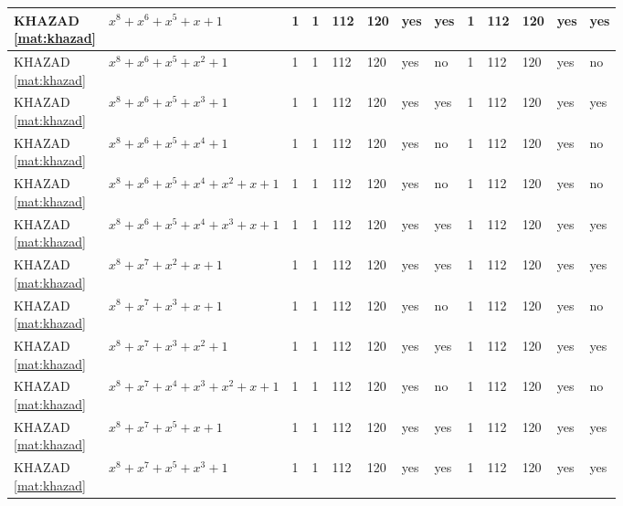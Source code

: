 \begin{tiny}
\begin{longtable}{|l|l|l|l|l|l|l|l|l|l|l|l|l|}
\shortstack{KHAZAD \\ \eqref{mat:khazad}} & $x^8 + x^6 + x^5 + x + 1$ & 1 & 1 & 112 & 120 & yes & yes & 1 & 112 & 120 & yes & yes \\ \hline
\shortstack{KHAZAD \\ \eqref{mat:khazad}} & $x^8 + x^6 + x^5 + x^2 + 1$ & 1 & 1 & 112 & 120 & yes & no & 1 & 112 & 120 & yes & no \\ \hline
\shortstack{KHAZAD \\ \eqref{mat:khazad}} & $x^8 + x^6 + x^5 + x^3 + 1$ & 1 & 1 & 112 & 120 & yes & yes & 1 & 112 & 120 & yes & yes \\ \hline
\shortstack{KHAZAD \\ \eqref{mat:khazad}} & $x^8 + x^6 + x^5 + x^4 + 1$ & 1 & 1 & 112 & 120 & yes & no & 1 & 112 & 120 & yes & no \\ \hline
\shortstack{KHAZAD \\ \eqref{mat:khazad}} & $x^8 + x^6 + x^5 + x^4 + x^2 + x + 1$ & 1 & 1 & 112 & 120 & yes & no & 1 & 112 & 120 & yes & no \\ \hline
\shortstack{KHAZAD \\ \eqref{mat:khazad}} & $x^8 + x^6 + x^5 + x^4 + x^3 + x + 1$ & 1 & 1 & 112 & 120 & yes & yes & 1 & 112 & 120 & yes & yes \\ \hline
\shortstack{KHAZAD \\ \eqref{mat:khazad}} & $x^8 + x^7 + x^2 + x + 1$ & 1 & 1 & 112 & 120 & yes & yes & 1 & 112 & 120 & yes & yes \\ \hline
\shortstack{KHAZAD \\ \eqref{mat:khazad}} & $x^8 + x^7 + x^3 + x + 1$ & 1 & 1 & 112 & 120 & yes & no & 1 & 112 & 120 & yes & no \\ \hline
\shortstack{KHAZAD \\ \eqref{mat:khazad}} & $x^8 + x^7 + x^3 + x^2 + 1$ & 1 & 1 & 112 & 120 & yes & yes & 1 & 112 & 120 & yes & yes \\ \hline
\shortstack{KHAZAD \\ \eqref{mat:khazad}} & $x^8 + x^7 + x^4 + x^3 + x^2 + x + 1$ & 1 & 1 & 112 & 120 & yes & no & 1 & 112 & 120 & yes & no \\ \hline
\shortstack{KHAZAD \\ \eqref{mat:khazad}} & $x^8 + x^7 + x^5 + x + 1$ & 1 & 1 & 112 & 120 & yes & yes & 1 & 112 & 120 & yes & yes \\ \hline
\shortstack{KHAZAD \\ \eqref{mat:khazad}} & $x^8 + x^7 + x^5 + x^3 + 1$ & 1 & 1 & 112 & 120 & yes & yes & 1 & 112 & 120 & yes & yes \\ \hline

\end{longtable}
\end{tiny}
